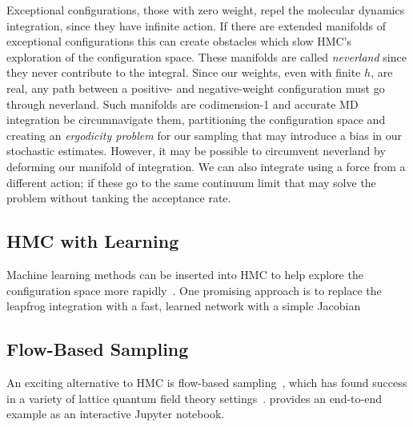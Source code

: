 Exceptional configurations, those with zero weight, repel the molecular dynamics integration, since they have infinite action.
If there are extended manifolds of exceptional configurations this can create obstacles which slow HMC's exploration of the configuration space.
These manifolds are called \emph{neverland} since they never contribute to the integral.
Since our weights, even with finite $h$, are real, any path between a positive- and negative-weight configuration must go through neverland.
Such manifolds are codimension-1 and accurate MD integration be circumnavigate them, partitioning the configuration space and creating an \emph{ergodicity problem} for our sampling that may introduce a bias in our stochastic estimates\cite{Wynen:2018ryx}.
However, it may be possible to circumvent neverland by deforming our manifold of integration.
We can also integrate using a force from a different action; if these go to the same continuum limit that may solve the problem without tanking the acceptance rate.

\subsection{HMC with Learning}

Machine learning methods can be inserted into HMC to help explore the configuration space more rapidly~\cite{Foreman:2021ljl}.
One promising approach is to replace the leapfrog integration with a fast, learned network with a simple Jacobian~\cite{Foreman:2021rhs}

\subsection{Flow-Based Sampling}

An exciting alternative to HMC is flow-based sampling~\cite{Albergo:2019eim,Rezende:2020hrd,Kanwar:2020xzo}, which has found success in a variety of lattice quantum field theory settings~\cite{Albergo:2022qfi}.
 provides an end-to-end example as an interactive Jupyter notebook.
